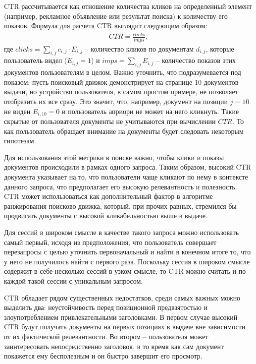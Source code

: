 \documentclass[diploma]{nanolab2015}
\begin{document}
CTR рассчитывается как отношение количества кликов на определенный элемент (например, рекламное объявление или результат поиска) к количеству его показов. Формула для расчета CTR выглядит следующим образом:
\begin{align}
  CTR = \frac{clicks}{imps},
\end{align}
где $clicks = \sum_{i,j} c_{i,j} \cdot E_{i,j}$ -- количество кликов по документам $d_{i,j}$, которые пользователь видел ($E_{i,j}=1$) и $imps = \sum_{i,j}E_{i,j}$ -- количество показов этих документов пользователям в целом. Важно уточнить, что подразумевается под показом: пусть поисковый движок демонстрирует на странице 10 документов выдачи, но устройство пользователя, в самом простом примере, не позволяет отобразить их все сразу. Это значит, что, например, документ на позиции $j=10$ не виден $E_{i,10} = 0$ и пользователь априори не может на него кликнуть. Такие скрытые от пользователя документы не учитываются при вычислении $CTR$. То как пользователь обращает внимание на документы будет следовать некоторым гипотезам.

Для использования этой метрики в поиске важно, чтобы клики и показы документов происходили в рамках одного запроса. Таким образом, высокий CTR документа указывает на то, что пользователи чаще кликают по нему в контексте данного запроса, что предполагает его высокую релевантность и полезность. CTR может использоваться как дополнительный фактор в алгоритме ранжирования поисково движка, который, при прочих равных, стремился бы продвигать документы с высокой кликабельностью выше в выдаче.

Для сессий в широком смысле в качестве такого запроса можно использовать самый первый, исходя из предположения, что пользователь совершает перезапросы с целью уточнить первоначальный и найти в конечном итоге то, что у него не получилось найти с первого раза. Поскольку сессия в широком смысле содержит в себе несколько сессий в узком смысле, то CTR можно считать и по каждой такой сессии с уникальным запросом.

CTR обладает рядом существенных недостатков, среди самых важных можно выделить два: неустойчивость перед позиционной предвзятостью и злоупотреблением привлекательными заголовками. В первом случае высокий CTR будут получать документы на первых позициях в выдаче вне зависимости от их фактической релевантности. Во втором -- пользователя может заинтересовать непосредственно заголовок, в то время как сам документ покажется ему бесполезным и он быстро завершит его просмотр.
\end{document}
